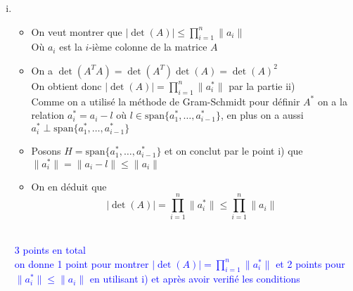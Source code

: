 \documentclass[11pt, a4paper, oneside]{article}
\newcommand{\indice}[1]{{\scriptsize \color{RubineRed} {#1}}}
\begin{document}
\begin{enumerate}[i)]
\item 
\begin{itemize} 
\item On veut montrer que $|\det(A)| \leq \prod_{i=1}^n \lVert a_i \rVert$ \\
\indice{Où $a_i$ est la $i$-ième colonne de la matrice $A$}
\item On a $\det(A^TA) = \det(A^T)\det(A) = \det(A)^2$ \\
\indice {On obtient donc $|\det(A)| = \prod_{i=1}^n \lVert a_i^* \rVert$ par la partie ii)} \\
\indice{Comme on a utilisé la méthode de Gram-Schmidt pour définir $A^*$ on a la relation $a_i^* = a_i -l$ où $l \in \text{span}\{a_1^*,\ldots,a_{i-1}^*\}$, en plus on a aussi $a_i^* \perp \text{span}\{a_1^*,\ldots,a_{i-1}^*\}$}
\item Posons $H = \text{span}\{a_1^*,\ldots,a_{i-1}^*\}$ et on conclut par le point i) que $\lVert a_i^* \rVert = \lVert a_i-l \rVert \leq \lVert a_i \rVert$
\item On en déduit que $$|\det(A)| = \prod_{i=1}^n \lVert a_i^* \rVert \leq \prod_{i=1}^n \lVert a_i \rVert$$ \\
\end{itemize}
\textcolor{blue}{3 points en total \\ on donne 1 point pour montrer $|\det(A)| = \prod_{i=1}^n \lVert a_i^* \rVert$ et 2 points pour $\lVert a_i^* \rVert \leq \lVert a_i \rVert$ en utilisant i) et après avoir verifié les conditions}
\end{enumerate}
\end{document}
